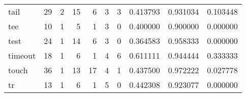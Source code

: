 \begin{longtable}{lrrrrrrrrr}
tail      &                                       29 &                                                  2 &                                                 15 &                                                  6 &                                                  3 &                                                  3 &                                           0.413793 &                               0.931034 &                             0.103448 \\
tee       &                                       10 &                                                  1 &                                                  5 &                                                  1 &                                                  3 &                                                  0 &                                           0.400000 &                               0.900000 &                             0.000000 \\
test      &                                       24 &                                                  1 &                                                 14 &                                                  6 &                                                  3 &                                                  0 &                                           0.364583 &                               0.958333 &                             0.000000 \\
timeout   &                                       18 &                                                  1 &                                                  6 &                                                  1 &                                                  4 &                                                  6 &                                           0.611111 &                               0.944444 &                             0.333333 \\
touch     &                                       36 &                                                  1 &                                                 13 &                                                 17 &                                                  4 &                                                  1 &                                           0.437500 &                               0.972222 &                             0.027778 \\
tr        &                                       13 &                                                  1 &                                                  6 &                                                  1 &                                                  5 &                                                  0 &                                           0.442308 &                               0.923077 &                             0.000000 \\

\end{longtable}
